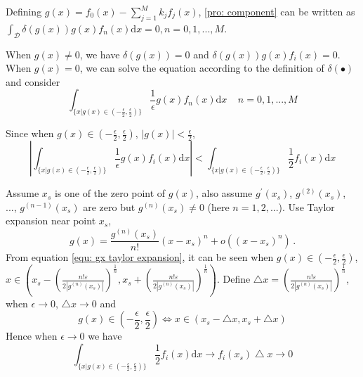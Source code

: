 \documentclass[12pt,journal,a4paper,twoside,onecolumn]{IEEEtran}
\begin{document}
\begin{spacing}{2.5}
Defining $g(x) = f_0(x) - \sum_{j=1}^{M} k_jf_j(x)$, \eqref{pro: component} can be written as $\int_{\mathcal{D}}\delta(g(x))g(x)f_n(x)\mathrm{d}x = 0, n = 0, 1, ..., M$.

When $g(x) \neq 0$, we have $\delta(g(x)) = 0$ and $\delta(g(x))g(x)f_i(x) = 0$.   When  $g(x) = 0$, we can solve the equation according to the definition of $\delta(\bullet)$ and consider
\begin{equation}
\label{pro: important}
\int_{\{x|g(x)\in (-\frac{\epsilon}{2}, \frac{\epsilon}{2})\}} \frac{1}{\epsilon} g(x)f_n(x) \mathrm{d}x\;\;\;\;n=0, 1, ..., M
\end{equation}

Since when $g(x) \in (-\frac{\epsilon}{2}, \frac{\epsilon}{2})$, $|g(x)| < \frac{\epsilon}{2}$,
\begin{equation}|
\int_{\{x|g(x)\in (-\frac{\epsilon}{2}, \frac{\epsilon}{2})\}} \frac{1}{\epsilon} g(x)f_i(x) \mathrm{d}x | <
\int_{\{x|g(x)\in (-\frac{\epsilon}{2}, \frac{\epsilon}{2})\}} \frac{1}{2}f_i(x) \mathrm{d}x
\end{equation}

Assume $x_s$ is one of the zero point of $g(x)$, also assume $g^\prime(x_s)$, $g^{(2)}(x_s)$, ..., $g^{(n-1)}(x_s)$ are zero but $g^{(n)}(x_s) \neq 0$ (here $n = 1, 2, ...$). Use Taylor expansion near point $x_s$,
\begin{equation}
  \label{equ: gx taylor expansion}
  g(x) = \frac{g^{(n)}(x_s)}{n!}(x - x_s)^n + o((x - x_s)^n)\,.
\end{equation}
\def \LEFT{ x_s
  -\left(\frac{n!\varepsilon}{2|g^{(n)}(x_s)|}\right)^{\frac{1}{n}}}
  \def \RIGHT{ x_s
  +\left(\frac{n!\varepsilon}{2|g^{(n)}(x_s)|}\right)^{\frac{1}{n}}}
From equation \eqref{equ: gx taylor expansion}, it can be seen when $g(x)\in (-\frac{\epsilon}{2}, \frac{\epsilon}{2})$, $x \in \left(
      \LEFT, \RIGHT
  \right)$.  Define $\bigtriangleup x = \left(\frac{n!\varepsilon}{2|g^{(n)}(x_s)|}\right)^{\frac{1}{n}}$, when $\epsilon \rightarrow 0$, $\bigtriangleup x \rightarrow 0$ and
\begin{equation}
\label{pro: scale}
g(x) \in (-\frac{\epsilon}{2}, \frac{\epsilon}{2})  \Leftrightarrow x \in (x_s -\bigtriangleup x, x_s + \bigtriangleup x)
\end{equation}
 Hence when $\epsilon \rightarrow 0$ we have
\begin{equation}
\int_{\{x|g(x)\in (-\frac{\epsilon}{2}, \frac{\epsilon}{2})\}} \frac{1}{2}f_i(x) \mathrm{d}x \rightarrow
f_i(x_s)\bigtriangleup x \rightarrow 0
\end{equation}


\end{spacing}
\end{document}
